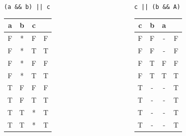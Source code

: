 \documentclass[xcolor = {dvipsnames, table}]{beamer}
\begin{document}
\begin{frame}
    \centering
    \begin{columns}
        \begin{column}{0.3\textwidth}
            \centering
            \lstinline{(a && b) || c}
            \begin{tabular}{c c c c}
                a & b & c & \\
                \hline
                F & * & F & F \\
                F & * & T & T \\
                F & * & F & F \\
                F & * & T & T \\

                T & F & F & F \\
                T & F & T & T \\
                T & T & * & T \\
                T & T & * & T \\
            \end{tabular}
        \end{column}

        \begin{column}{0.3\textwidth}
            \centering
            \lstinline{c || (b && A)}
            \begin{tabular}{c c c c}
                c & b & a & \\
                \hline
                F & F & - & F \\
                F & F & - & F \\
                F & T & F & F \\
                F & T & T & T \\

                T & - & - & T \\
                T & - & - & T \\
                T & - & - & T \\
                T & - & - & T \\
            \end{tabular}
        \end{column}
    \end{columns}
\end{frame}
\end{document}
